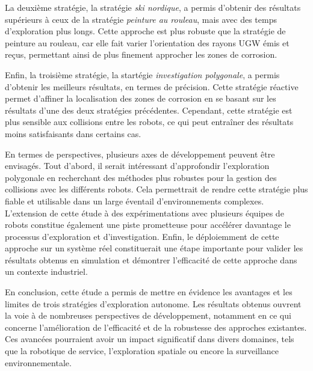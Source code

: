 \documentclass[francais,RandD]{rapportPFE}
\begin{document}
		La deuxième stratégie, la stratégie \textit{ski nordique}, a permis d'obtenir des résultats supérieurs à ceux de la stratégie \textit{peinture au rouleau}, mais avec des temps d'exploration plus longs.
		Cette approche est plus robuste que la stratégie de peinture au rouleau, car elle fait varier l'orientation des rayons UGW émis et reçus, permettant ainsi de plus finement approcher les zones de corrosion.

		Enfin, la troisième stratégie, la startégie \textit{investigation polygonale}, a permis d'obtenir les meilleurs résultats, en termes de précision.
		Cette stratégie réactive permet d'affiner la localisation des zones de corrosion en se basant sur les résultats d'une des deux stratégies précédentes.
		Cependant, cette stratégie est plus sensible aux collisions entre les robots, ce qui peut entraîner des résultats moins satisfaisants dans certains cas.

		En termes de perspectives, plusieurs axes de développement peuvent être envisagés.
		Tout d'abord, il serait intéressant d'approfondir l'exploration polygonale en recherchant des méthodes plus robustes pour la gestion des collisions avec les différents robots.
		Cela permettrait de rendre cette stratégie plus fiable et utilisable dans un large éventail d'environnements complexes.
		L'extension de cette étude à des expérimentations avec plusieurs équipes de robots constitue également une piste prometteuse pour accélérer davantage le processus d'exploration et d'investigation.
		Enfin, le déploiemment de cette approche sur un système réel constituerait une étape importante pour valider les résultats obtenus en simulation et démontrer l'efficacité de cette approche dans un contexte industriel.

		En conclusion, cette étude a permis de mettre en évidence les avantages et les limites de trois stratégies d'exploration autonome. Les résultats obtenus ouvrent la voie à de nombreuses perspectives de développement, notamment en ce qui concerne l'amélioration de l'efficacité et de la robustesse des approches existantes. Ces avancées pourraient avoir un impact significatif dans divers domaines, tels que la robotique de service, l'exploration spatiale ou encore la surveillance environnementale.
	
	
	\appendix
\end{document}
